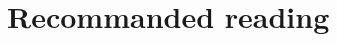 \chapter{Recommanded reading}
\label{sec:recommanded-reading}
\thispagestyle{fancy}

\lipsum[4]

\clearemptydoublepage